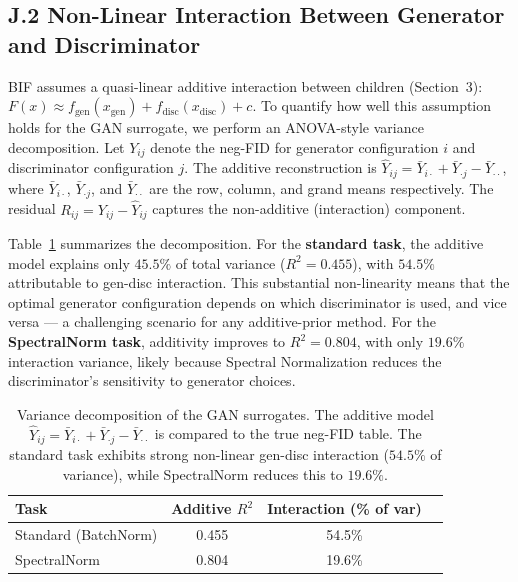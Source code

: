 \subsection*{J.2 Non-Linear Interaction Between Generator and Discriminator}

BIF assumes a quasi-linear additive interaction between children
(Section~3): $F(x) \approx f_{\text{gen}}(x_{\text{gen}}) + f_{\text{disc}}(x_{\text{disc}}) + c$.
To quantify how well this assumption holds for the GAN surrogate,
we perform an ANOVA-style variance decomposition.
Let $Y_{ij}$ denote the neg-FID for generator configuration $i$ and
discriminator configuration $j$.
The additive reconstruction is
$\hat{Y}_{ij} = \bar{Y}_{i \cdot} + \bar{Y}_{\cdot j} - \bar{Y}_{\cdot \cdot}$,
where $\bar{Y}_{i \cdot}$, $\bar{Y}_{\cdot j}$, and $\bar{Y}_{\cdot \cdot}$
are the row, column, and grand means respectively.
The residual $R_{ij} = Y_{ij} - \hat{Y}_{ij}$ captures the non-additive
(interaction) component.

Table~\ref{tab:app_nonlinearity} summarizes the decomposition.
For the \textbf{standard task}, the additive model explains only
$45.5\%$ of total variance ($R^2 = 0.455$), with $54.5\%$ attributable to
gen-disc interaction.
This substantial non-linearity means that the optimal generator
configuration depends on which discriminator is used, and vice versa
--- a challenging scenario for any additive-prior method.
For the \textbf{SpectralNorm task}, additivity improves to $R^2 = 0.804$,
with only $19.6\%$ interaction variance, likely because Spectral
Normalization reduces the discriminator's sensitivity to generator
choices.

\begin{table}[h]
\centering
\small
\begin{tabular}{lccc}
\toprule
Task & Additive $R^2$ & Interaction (\% of var) \\
\midrule
Standard (BatchNorm)  & 0.455 & 54.5\% \\
SpectralNorm          & 0.804 & 19.6\% \\
\bottomrule
\end{tabular}
\caption{Variance decomposition of the GAN surrogates.
The additive model $\hat{Y}_{ij} = \bar{Y}_{i\cdot} + \bar{Y}_{\cdot j} - \bar{Y}_{\cdot\cdot}$
is compared to the true neg-FID table.
The standard task exhibits strong non-linear gen-disc interaction
($54.5\%$ of variance), while SpectralNorm reduces this to $19.6\%$.}
\label{tab:app_nonlinearity}
\end{table}

